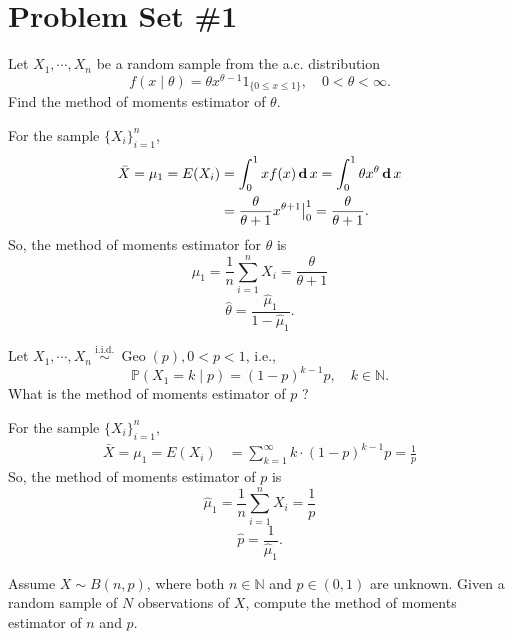 \section{Problem Set \#1}

\begin{exercise}
    Let \(X_{1}, \cdots, X_{n}\) be a random sample from the a.c. distribution
    \[
    f(x \mid \theta)=\theta x^{\theta-1} 1_{\{0 \leqslant x \leqslant 1\}}, \quad 0<\theta<\infty .
    \]
    Find the method of moments estimator of \(\theta\).
\end{exercise}

\begin{solution}
    For the sample \(\{X_i\}_{i=1}^n\), 
    \[
        \begin{aligned}
            \bar{X}=\mu_1=E(X_i)&=\int_0^1xf(x)\,\mathbf{d}\, x=\int_0^1\theta x^\theta\,\mathbf{d}\, x\\
            &=\frac{\theta}{\theta+1}x^{\theta+1}\big|_0^1=\frac{\theta}{\theta+1}. 
        \end{aligned}
    \]
    So, the method of moments estimator for $\theta$ is 
    \[
        \hat{\mu}_1=\frac{1}{n}\sum_{i=1}^nX_i=\frac{\theta}{\theta+1}
    \]
    \[
        \hat{\theta}=\frac{\hat{\mu}_1}{1-\hat{\mu}_1}. 
    \]
\end{solution}

\begin{exercise}
    Let \(X_{1}, \cdots, X_{n} \stackrel{\text { i.i.d. }}{\sim} \operatorname{Geo}(p), 0<p<1\), i.e.,
    \[
    \mathbb{P}\left(X_{1}=k \mid p\right)=(1-p)^{k-1} p, \quad k \in \mathbb{N} .
    \]
    What is the method of moments estimator of \(p\) ?
\end{exercise}

\begin{solution}
    For the sample \(\{X_i\}_{i=1}^n\), 
    \[
        \begin{aligned}
            \bar{X}=\mu_1=E(X_i)&=\sum_{k=1}^\infty k\cdot (1-p)^{k-1}p=\frac{1}{p}
        \end{aligned}
    \]
    So, the method of moments estimator of $p$ is 
    \[
        \hat{\mu}_1=\frac{1}{n}\sum_{i=1}^nX_i=\frac{1}{p}
    \]
    \[
        \hat{p}=\frac{1}{\hat{\mu}_1}. 
    \]
\end{solution}
    
\begin{exercise}
    Assume \(X \sim B(n, p)\), where both \(n \in \mathbb{N}\) and \(p \in(0,1)\) are unknown. Given a random sample of \(N\) observations of \(X\), compute the method of moments estimator of \(n\) and \(p\).
\end{exercise}

